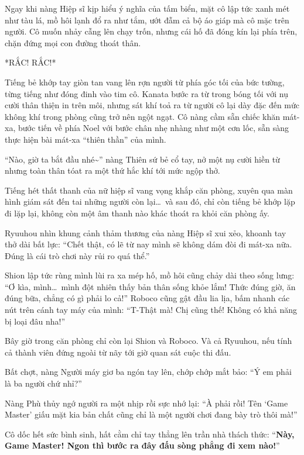\documentclass[../main.tex]{subfiles}
\begin{document}
Ngay khi nàng Hiệp sĩ kịp hiểu ý nghĩa của tấm biển, mặt cô lập tức xanh mét như tàu lá, mồ hôi lạnh đổ ra như tắm, ướt đẫm cả bộ áo giáp mà cô mặc trên người. Cô muốn nhảy cẫng lên chạy trốn, nhưng cái hố đã đóng kín lại phía trên, chặn đứng mọi con đường thoát thân.

*RẮC! RẮC!*

Tiếng bẻ khớp tay giòn tan vang lên rợn người từ phía góc tối của bức tường, từng tiếng như đóng đinh vào tim cô. Kanata bước ra từ trong bóng tối với nụ cười thân thiện in trên môi, nhưng sát khí toả ra từ người cô lại dày đặc đến mức không khí trong phòng cũng trở nên ngột ngạt. Cô nàng cầm sẵn chiếc khăn mát-xa, bước tiến về phía Noel với bước chân nhẹ nhàng như một cơn lốc, sẵn sàng thực hiện bài mát-xa ``thiên thần'' của mình.


``Nào, giờ ta bắt đầu nhé\~{}'' nàng Thiên sứ bẻ cổ tay, nở một nụ cười hiền từ nhưng toàn thân tóat ra một thứ hắc khí tới mức ngộp thở.

Tiếng hét thất thanh của nữ hiệp sĩ vang vọng khắp căn phòng, xuyên qua màn hình giám sát đến tai những người còn lại\dots\ và sau đó, chỉ còn tiếng bẻ khớp lặp đi lặp lại, không còn một âm thanh nào khác thoát ra khỏi căn phòng ấy.

Ryuuhou nhìn khung cảnh thảm thương của nàng Hiệp sĩ xui xẻo, khoanh tay thở dài bất lực: ``Chết thật, có lẽ từ nay mình sẽ không dám đòi đi mát-xa nữa. Đúng là cái trò chơi này rủi ro quá thể.''

Shion lập tức rùng mình lùi ra xa mép hố, mồ hôi cũng chảy dài theo sống lưng: ``Ơ kìa, mình\dots\ mình đột nhiên thấy bản thân sống khỏe lắm! Thức đúng giờ, ăn đúng bữa, chẳng có gì phải lo cả!'' Roboco cũng gật đầu lia lịa, bấm nhanh các nút trên cánh tay máy của mình: ``T-Thật mà! Chị cũng thế! Không có khả năng bị loại đâu nha!''

\ct

Bây giờ trong căn phòng chỉ còn lại Shion và Roboco. Và cả Ryuuhou, nếu tính cả thành viên đứng ngoài từ nãy tới giờ quan sát cuộc thi đấu.

Bất chợt, nàng Người máy giơ ba ngón tay lên, chớp chớp mắt bảo: ``Ý em phải là ba người chứ nhỉ?''

Nàng Phù thủy ngớ người ra một nhịp rồi sực nhớ lại: ``À phải rồi! Tên `Game Master' giấu mặt kia bản chất cũng chỉ là một người chơi đang bày trò thôi mà!''

Cô dốc hết sức bình sinh, hất cằm chỉ tay thẳng lên trần nhà thách thức: ``\textbf{Này, Game Master! Ngon thì bước ra đây đấu sòng phẳng đi xem nào!}''
\end{document}
